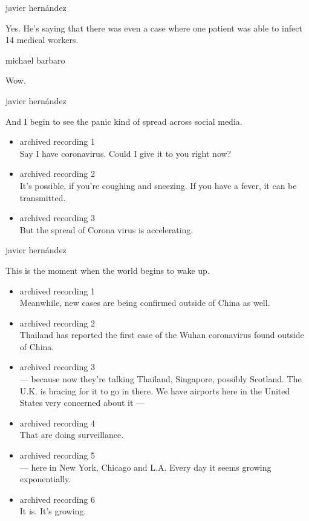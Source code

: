 javier hernández

Yes. He's saying that there was even a case where one patient was able
to infect 14 medical workers.

michael barbaro

Wow.

javier hernández

And I begin to see the panic kind of spread across social media.

\begin{itemize}
\item
  archived recording 1\\
  Say I have coronavirus. Could I give it to you right now?
\item
  archived recording 2\\
  It's possible, if you're coughing and sneezing. If you have a fever,
  it can be transmitted.
\item
  archived recording 3\\
  But the spread of Corona virus is accelerating.
\end{itemize}

javier hernández

This is the moment when the world begins to wake up.

\begin{itemize}
\item
  archived recording 1\\
  Meanwhile, new cases are being confirmed outside of China as well.
\item
  archived recording 2\\
  Thailand has reported the first case of the Wuhan coronavirus found
  outside of China.
\item
  archived recording 3\\
  --- because now they're talking Thailand, Singapore, possibly
  Scotland. The U.K. is bracing for it to go in there. We have airports
  here in the United States very concerned about it ---
\item
  archived recording 4\\
  That are doing surveillance.
\item
  archived recording 5\\
  --- here in New York, Chicago and L.A. Every day it seems growing
  exponentially.
\item
  archived recording 6\\
  It is. It's growing.
\end{itemize}

